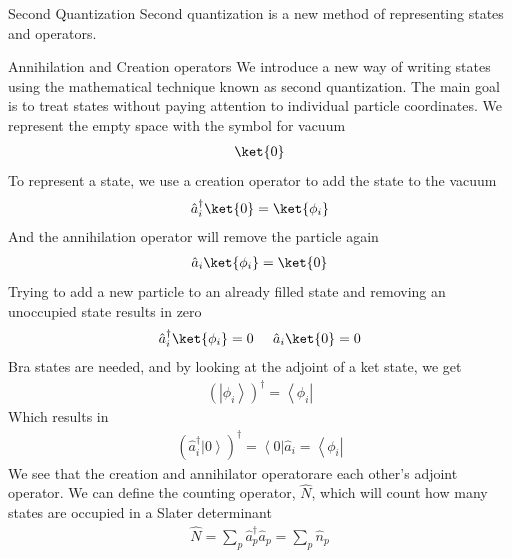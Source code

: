 \documentclass[twoside,english]{uiofysmaster}
\begin{document}
\begin{chapter}{Second Quantization}
 	Second quantization is a new method of representing states and operators. 
	\begin{section}{Annihilation and Creation operators}
		We introduce a new way of writing states using the mathematical technique known as second quantization. The main goal is to treat states without paying attention
		to individual particle coordinates. We represent the empty space with the symbol for vacuum
		\begin{align}
			\ket{0}
		\end{align}
		To represent a state, we use a creation operator to add the state to the vacuum
		\begin{align}
			\hat a_i^{\dagger} \ket{0} = \ket{\phi_i}
		\end{align}
		And the annihilation operator will remove the particle again
		\begin{align}
			\hat a_i \ket{\phi_i} = \ket{0}
		\end{align}
		Trying to add a new particle to an already filled state and removing an unoccupied state results in zero
		\begin{align}
			\hat a_i^{\dagger} \ket{\phi_i} = 0 \;\;\;\;\; \hat a_i \ket{0} = 0
		\end{align}
		Bra states are needed, and by looking at the adjoint of a ket state, we get
		\begin{align}
			\left(\left| \phi_i \right> \right)^\dagger = \left< \phi_i \right| 
		\end{align}
		Which results in
		\begin{align}
			\left( \hat a_i^\dagger \left| 0 \right> \right)^\dagger = \left< 0 \right| \hat a_i = \left< \phi_i \right|
		\end{align}
		We see that the creation and annihilator operatorare each other's adjoint operator. We can define the counting operator, $\hat N$, which will count how many states are occupied in a Slater determinant
		\begin{align}
			\hat N = \sum_p \hat a^\dagger_p \hat a_p = \sum_p \hat n_p
		\end{align}
	\end{section}


\end{chapter}
\end{document}
